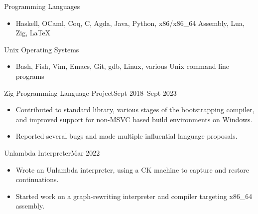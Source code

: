 \documentclass[a4paper,10pt]{article}
\begin{document}
    \begin{skill}{Programming Languages}
      \begin{itemize}[label={},topsep=4pt, partopsep=0pt, itemsep=-2pt]
        \item Haskell, OCaml, Coq, C, Agda, Java, Python, x86/x86\_64 Assembly, Lua, Zig, \LaTeX{}
      \end{itemize}
    \end{skill}

    \begin{skill}{Unix Operating Systems}
      \begin{itemize}[label={}, topsep=4pt, partopsep=0pt, itemsep=-2pt]
        \item Bash, Fish, Vim, Emacs, Git, gdb, Linux, various Unix command line programs
     \end{itemize}
    \end{skill}

    \begin{activity}{Zig Programming Language Project}{Sept 2018--Sept 2023}
      \begin{itemize}[topsep=4pt, partopsep=0pt, itemsep=-2pt]
        \item Contributed to standard library, various stages of the bootstrapping compiler, and improved support for non-MSVC based build environments on Windows.
        \item Reported several bugs and made multiple influential language proposals.
      \end{itemize}
    \end{activity}


    \begin{activity}{Unlambda Interpreter}{Mar 2022}
      \begin{itemize}[topsep=4pt, partopsep=0pt, itemsep=-2pt]
        \item Wrote an Unlambda interpreter, using a CK machine to capture and restore continuations.
        \item Started work on a graph-rewriting interpreter and compiler targeting x86\_64 assembly.
      \end{itemize}
    \end{activity}
\end{document}
